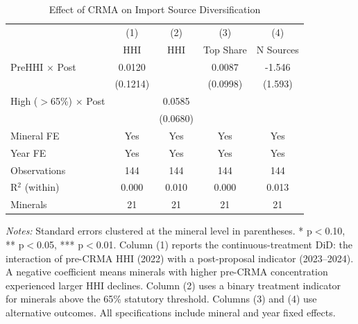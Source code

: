 \begin{table}[H]
\centering
\caption{Effect of CRMA on Import Source Diversification}
\label{tab:main}
\begin{threeparttable}
\begin{tabular}{lcccc}
\toprule
& (1) & (2) & (3) & (4) \\
& HHI & HHI & Top Share & N Sources \\
\midrule
PreHHI $\times$ Post & 0.0120 & & 0.0087 & -1.546 \\
& (0.1214) & & (0.0998) & (1.593) \\[6pt]
High ($>$65\%) $\times$ Post & & 0.0585 & & \\
& & (0.0680) & & \\[6pt]
\midrule
Mineral FE & Yes & Yes & Yes & Yes \\
Year FE & Yes & Yes & Yes & Yes \\
Observations & 144 & 144 & 144 & 144 \\
R$^2$ (within) & 0.000 & 0.010 & 0.000 & 0.013 \\
Minerals & 21 & 21 & 21 & 21 \\
\bottomrule
\end{tabular}
\begin{tablenotes}[flushleft]
\small
\item \textit{Notes:} Standard errors clustered at the mineral level in parentheses. * p$<$0.10, ** p$<$0.05, *** p$<$0.01. Column (1) reports the continuous-treatment DiD: the interaction of pre-CRMA HHI (2022) with a post-proposal indicator (2023--2024). A negative coefficient means minerals with higher pre-CRMA concentration experienced larger HHI declines. Column (2) uses a binary treatment indicator for minerals above the 65\% statutory threshold. Columns (3) and (4) use alternative outcomes. All specifications include mineral and year fixed effects.
\end{tablenotes}
\end{threeparttable}
\end{table}
